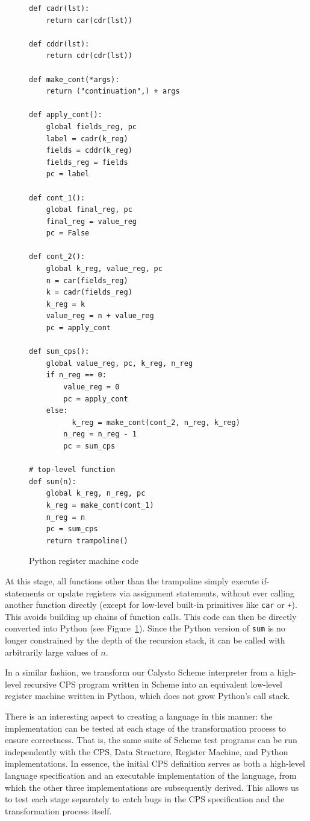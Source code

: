 \documentclass[acmsmall,screen,authorversion]{acmart}
\begin{document}
\begin{figure}[h]
\begin{minipage}{0.4\textwidth}
{\begin{verbatim}
def cadr(lst):
    return car(cdr(lst))

def cddr(lst):
    return cdr(cdr(lst))

def make_cont(*args):
    return ("continuation",) + args

def apply_cont():
    global fields_reg, pc
    label = cadr(k_reg)
    fields = cddr(k_reg)
    fields_reg = fields
    pc = label

def cont_1():
    global final_reg, pc
    final_reg = value_reg
    pc = False

def cont_2():
    global k_reg, value_reg, pc
    n = car(fields_reg)
    k = cadr(fields_reg)
    k_reg = k
    value_reg = n + value_reg
    pc = apply_cont

def sum_cps():
    global value_reg, pc, k_reg, n_reg
    if n_reg == 0:
        value_reg = 0
        pc = apply_cont
    else:
          k_reg = make_cont(cont_2, n_reg, k_reg)
        n_reg = n_reg - 1
        pc = sum_cps

# top-level function
def sum(n):
    global k_reg, n_reg, pc
    k_reg = make_cont(cont_1)
    n_reg = n
    pc = sum_cps
    return trampoline()
\end{verbatim}
}
\caption{Python register machine code}
\label{fig:pythonRM}
\end{minipage}
\end{figure}

At this stage, all functions other than the trampoline simply execute
if-statements or update registers via assignment statements, without ever
calling another function directly (except for low-level built-in primitives
like \texttt{car} or \texttt{+}).  This avoids building up chains of function
calls.  This code can then be directly converted into Python (see
Figure~\ref{fig:pythonRM}).  Since the Python version of \texttt{sum} is no
longer constrained by the depth of the recursion stack, it can be called with
arbitrarily large values of $n$.

In a similar fashion, we transform our Calysto Scheme interpreter from a
high-level recursive CPS program written in Scheme into an equivalent low-level
register machine written in Python, which does not grow Python's call stack.

There is an interesting aspect to creating a language in this manner: the
implementation can be tested at each stage of the transformation process to
ensure correctness. That is, the same suite of Scheme test programs can be run
independently with the CPS, Data Structure, Register Machine, and Python
implementations. In essence, the initial CPS definition serves as both a
high-level language specification and an executable implementation of the
language, from which the other three implementations are subsequently
derived. This allows us to test each stage separately to catch bugs in the CPS
specification and the transformation process itself.
\end{document}
